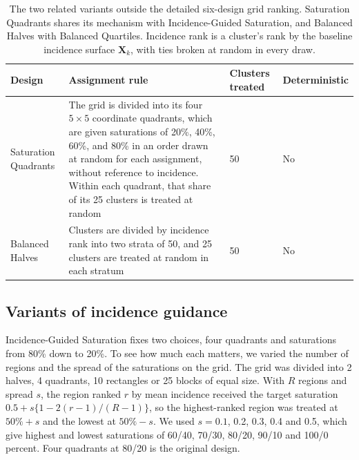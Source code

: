 \documentclass[11pt]{article}
\begin{document}
\begin{table}[!htb]

\small
\centering

\iffullsi\caption{The two related variants outside the detailed six-design grid ranking, in the format of Table \ref{tab:designs}. Saturation Quadrants shares its mechanism with Incidence-Guided Saturation, and Balanced Halves with Balanced Quartiles. Incidence rank and clusters treated are defined as in Table \ref{tab:designs}.}
\else\caption{The two related variants outside the detailed six-design grid ranking. Saturation Quadrants shares its mechanism with Incidence-Guided Saturation, and Balanced Halves with Balanced Quartiles. Incidence rank is a cluster's rank by the baseline incidence surface $\mathbf{X}_k$, with ties broken at random in every draw.}
\fi
\label{tab:excluded-designs}

\begin{tabular}{p{3.4cm}p{6.4cm}p{2.0cm}p{2.3cm}}

\toprule
Design & Assignment rule & Clusters treated & Deterministic \\

\midrule
Saturation Quadrants & The grid is divided into its four $5\times5$ coordinate quadrants, which are given saturations of 20\%, 40\%, 60\%, and 80\% in an order drawn at random for each assignment, without reference to incidence. Within each quadrant, that share of its 25 clusters is treated at random & 50 & No \\
Balanced Halves & Clusters are divided by incidence rank into two strata of 50, and 25 clusters are treated at random in each stratum & 50 & No \\

\bottomrule

\end{tabular}

\end{table}

\subsection{Variants of incidence guidance}\label{igs-variants-methods}

Incidence-Guided Saturation fixes two choices, four quadrants and saturations from 80\% down to 20\%. To see how much each matters, we varied the number of regions and the spread of the saturations on the grid. The grid was divided into 2 halves, 4 quadrants, 10 rectangles or 25 blocks of equal size. With \(R\) regions and spread \(s\), the region ranked \(r\) by mean incidence received the target saturation \(0.5 + s\{1 - 2(r-1)/(R-1)\}\), so the highest-ranked region was treated at \(50\% + s\) and the lowest at \(50\% - s\). We used \(s = 0.1\), 0.2, 0.3, 0.4 and 0.5, which give highest and lowest saturations of 60/40, 70/30, 80/20, 90/10 and 100/0 percent. Four quadrants at 80/20 is the original design.
\end{document}
